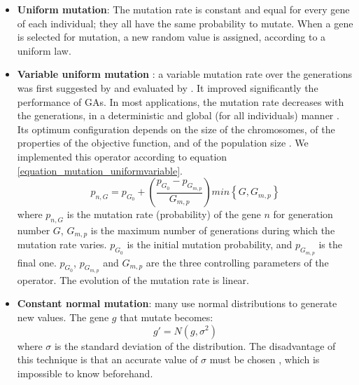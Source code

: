 \documentclass[twocol]{ametsoc}
\begin{document}
\begin{itemize}
	\item \textbf{Uniform mutation}: The mutation rate is constant and equal for every gene of each individual; they all have the same probability to mutate. When a gene is selected for mutation, a new random value is assigned, according to a uniform law.
	
	\item \textbf{Variable uniform mutation} \citep{Fogarty1989}: a variable mutation rate over the generations was first suggested by \citet{Holland1992b} and evaluated by \citet{Fogarty1989}. It improved significantly the performance of GAs. In most applications, the mutation rate decreases with the generations, in a deterministic and global (for all individuals) manner \citep{Back1992b}. Its optimum configuration depends on the size of the chromosomes, of the properties of the objective function, and of the population size \citep{Back1992b}. We implemented this operator according to equation \ref{equation_mutation_uniformvariable}.
	\begin{equation}
	p_{n,G} = p_{G_{0}}+\left( \dfrac{p_{G_{0}}-p_{G_{m,p}}}{G_{m,p}} \right) min\left\lbrace G,G_{m,p}\right\rbrace 
	\label{equation_mutation_uniformvariable}
	\end{equation}
	where $p_{n,G}$ is the mutation rate (probability) of the gene $n$ for generation number $G$, $G_{m,p}$ is the maximum number of generations during which the mutation rate varies. $p_{G_{0}}$ is the initial mutation probability, and $p_{G_{m,p}}$ is the final one. $p_{G_{0}}$, $p_{G_{m,p}}$ and $G_{m,p}$ are the three controlling parameters of the operator. The evolution of the mutation rate is linear.
	
	\item \textbf{Constant normal mutation}: many use normal distributions to generate new values. The gene $g$ that mutate becomes:
	\begin{equation}
	g' = N(g,\sigma^{2})
	\label{equation_mutating_normal_distribution}
	\end{equation}
	where $\sigma$ is the standard deviation of the distribution. The disadvantage of this technique is that an accurate value of $\sigma$ must be chosen \citep{Haupt2004}, which is impossible to know beforehand.
	

\end{itemize}
\end{document}
